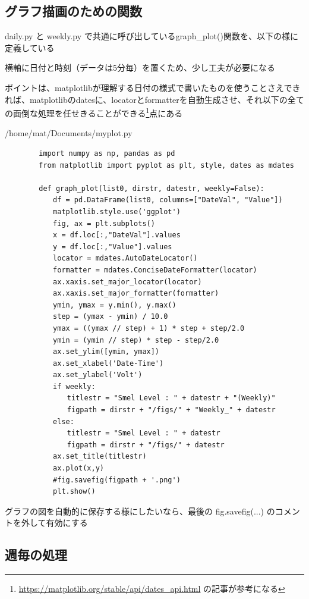 \documentclass[12pt,a4paper,uplatex]{jsbook}
\begin{document}
\subsection{グラフ描画のための関数}

daily.py と weekly.py で共通に呼び出しているgraph\_plot()関数を、以下の様に定義している

横軸に日付と時刻（データは5分毎）を置くため、少し工夫が必要になる

ポイントは、matplotlibが理解する日付の様式で書いたものを使うことさえできれば、matplotlibのdatesに、locatorとformatterを自動生成させ、それ以下の全ての面倒な処理を任せきることができる\footnote{\url{https://matplotlib.org/stable/api/dates_api.html}
	の記事が参考になる}点にある

\begin{itembox}[l]{/home/mat/Documents/myplot.py}
	\begin{verbatim}
		import numpy as np, pandas as pd
		from matplotlib import pyplot as plt, style, dates as mdates
		
		def graph_plot(list0, dirstr, datestr, weekly=False):
		　　df = pd.DataFrame(list0, columns=["DateVal", "Value"])
		　　matplotlib.style.use('ggplot')
		　　fig, ax = plt.subplots()
		　　x = df.loc[:,"DateVal"].values
		　　y = df.loc[:,"Value"].values
		　　locator = mdates.AutoDateLocator()
		　　formatter = mdates.ConciseDateFormatter(locator)
		　　ax.xaxis.set_major_locator(locator)
		　　ax.xaxis.set_major_formatter(formatter)
		　　ymin, ymax = y.min(), y.max()
		　　step = (ymax - ymin) / 10.0
		　　ymax = ((ymax // step) + 1) * step + step/2.0
		　　ymin = (ymin // step) * step - step/2.0
		　　ax.set_ylim([ymin, ymax])
		　　ax.set_xlabel('Date-Time')
		　　ax.set_ylabel('Volt')
		　　if weekly:
		　　　　titlestr = "Smel Level : " + datestr + "(Weekly)"
		　　　　figpath = dirstr + "/figs/" + "Weekly_" + datestr
		　　else:
		　　　　titlestr = "Smel Level : " + datestr
		　　　　figpath = dirstr + "/figs/" + datestr
		　　ax.set_title(titlestr)
		　　ax.plot(x,y)
		　　#fig.savefig(figpath + '.png')
		　　plt.show()	
	\end{verbatim}
\end{itembox}

グラフの図を自動的に保存する様にしたいなら、最後の fig.savefig(...) のコメントを外して有効にする

\newpage

\subsection{週毎の処理}
\end{document}
